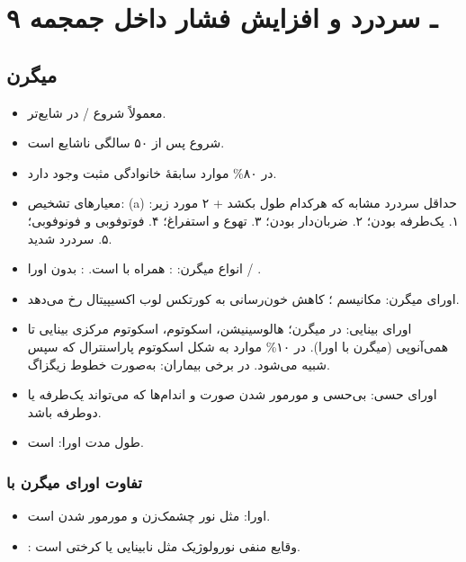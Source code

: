 \section{۹ ـ سردرد و افزایش فشار داخل جمجمه}
\subsection{میگرن}
\begin{itemize}
\item معمولاً شروع  / در  شایع‌تر.
\item شروع پس از ۵۰ سالگی ناشایع است.
\item در ۸۰\% موارد سابقهٔ خانوادگی مثبت وجود دارد.
\item معیارهای تشخیص: (a) حداقل  سردرد مشابه که هرکدام  طول بکشد + ۲ مورد زیر: ۱. یک‌طرفه بودن؛ ۲. ضربان‌دار بودن؛ ۳. تهوع و استفراغ؛ ۴. فوتوفوبی و فونوفوبی؛ ۵. سردرد شدید.
\item انواع میگرن: : همراه با  است. : بدون اورا / .
\item اورای میگرن: مکانیسم ؛ کاهش خون‌رسانی به کورتکس لوب اکسیپیتال رخ می‌دهد.
\item اورای بینایی:  در میگرن؛ هالوسینیشن، اسکوتوم، اسکوتوم مرکزی بینایی تا همی‌آنوپی (میگرن با اورا). در ۱۰\% موارد به شکل اسکوتوم پاراسنترال که سپس شبیه  می‌شود. در برخی بیماران: به‌صورت خطوط زیگزاگ.
\item اورای حسی: بی‌حسی و مورمور شدن صورت و اندام‌ها که می‌تواند یک‌طرفه یا دوطرفه باشد.
\item طول مدت اورا:  است.
\end{itemize}
\subsubsection{تفاوت اورای میگرن با }
\begin{itemize}
\item اورا:  مثل نور چشمک‌زن و مورمور شدن است.
\item {}: وقایع منفی نورولوژیک مثل نابینایی یا کرختی است.
\end{itemize}

